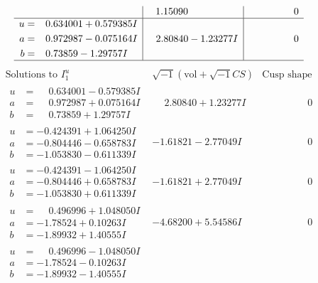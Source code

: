 \documentclass[1p]{elsarticle_modified}
\theoremstyle{definition}
\newcommand{\I}{\sqrt{-1}}
\begin{document}
$$\begin{array}{c|c|c}
 & \phantom{-}1.15090\phantom{ +0.000000I} & \phantom{-0.000000 } 0 \\ \hline\begin{aligned}
u &= \phantom{-}0.634001 + 0.579385 I \\
a &= \phantom{-}0.972987 - 0.075164 I \\
b &= \phantom{-}0.73859 - 1.29757 I\end{aligned}
 & \phantom{-}2.80840 - 1.23277 I & \phantom{-0.000000 } 0\\
 \hline 
 \end{array}$$\newpage$$\begin{array}{c|c|c}  
\text{Solutions to }I^u_{1}& \I (\text{vol} + \sqrt{-1}CS) & \text{Cusp shape}\\
 \hline 
\begin{aligned}
u &= \phantom{-}0.634001 - 0.579385 I \\
a &= \phantom{-}0.972987 + 0.075164 I \\
b &= \phantom{-}0.73859 + 1.29757 I\end{aligned}
 & \phantom{-}2.80840 + 1.23277 I & \phantom{-0.000000 } 0 \\ \hline\begin{aligned}
u &= -0.424391 + 1.064250 I \\
a &= -0.804446 - 0.658783 I \\
b &= -1.053830 - 0.611339 I\end{aligned}
 & -1.61821 - 2.77049 I & \phantom{-0.000000 } 0 \\ \hline\begin{aligned}
u &= -0.424391 - 1.064250 I \\
a &= -0.804446 + 0.658783 I \\
b &= -1.053830 + 0.611339 I\end{aligned}
 & -1.61821 + 2.77049 I & \phantom{-0.000000 } 0 \\ \hline\begin{aligned}
u &= \phantom{-}0.496996 + 1.048050 I \\
a &= -1.78524 + 0.10263 I \\
b &= -1.89932 + 1.40555 I\end{aligned}
 & -4.68200 + 5.54586 I & \phantom{-0.000000 } 0 \\ \hline\begin{aligned}
u &= \phantom{-}0.496996 - 1.048050 I \\
a &= -1.78524 - 0.10263 I \\
b &= -1.89932 - 1.40555 I\end{aligned}

\end{array}$$
\end{document}
